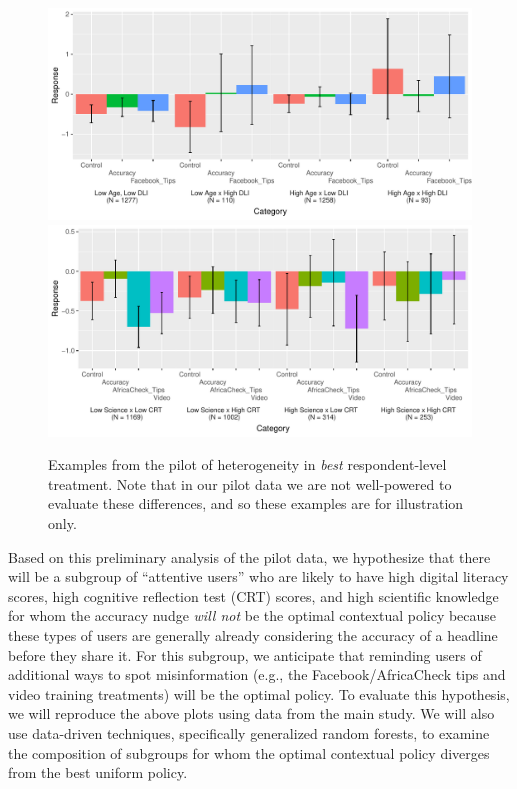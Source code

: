 \documentclass[letterpaper, 12pt, parskip=full,DIV=10]{scrartcl}
\begin{document}
\begin{figure}[H]
\centering
\includegraphics[width=\textwidth]{figures/age_dli.pdf}
\includegraphics[width=\textwidth]{figures/science_crt.pdf}
\caption{Examples from the pilot of heterogeneity in \textit{best} respondent-level treatment. Note that in our pilot data we are not well-powered to evaluate these differences, and so these examples are for illustration only. }
\label{fig:science_crt}
\end{figure}\FloatBarrier


{Based on this preliminary analysis of the pilot data, we hypothesize that there will be a subgroup of  ``attentive users'' who are likely to have high digital literacy scores, high cognitive reflection test (CRT) scores, and high scientific knowledge for whom the accuracy nudge \textit{will not} be the optimal contextual policy because these types of users are generally already considering the accuracy of a headline before they share it. For this subgroup, we anticipate that reminding users of additional ways to spot misinformation (e.g., the Facebook/AfricaCheck tips and video training treatments) will be the optimal policy. To evaluate this hypothesis, we will reproduce the above plots using data from the main study. We will also use data-driven techniques, specifically generalized random forests, to examine the composition of subgroups for whom the optimal contextual policy diverges from the best uniform policy.}
\end{document}
